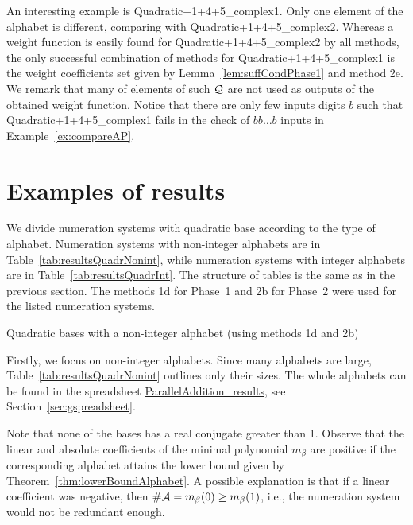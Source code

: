 An interesting example is Quadratic+1+4+5\_complex1. Only one element of the alphabet is different, comparing with Quadratic+1+4+5\_complex2. Whereas a weight function is easily found for Quadratic+1+4+5\_complex2 by all methods, the only successful combination of methods for Quadratic+1+4+5\_complex1 is the weight coefficients set given by Lemma~\ref{lem:suffCondPhase1} and method 2e. We remark that many of elements of such $\mathcal{Q}$ are not used as outputs of the obtained weight function. Notice   that there are only few inputs digits $b$ such that  Quadratic+1+4+5\_complex1 fails in the check of $bb\dots b$ inputs in Example~\ref{ex:compareAP}.





\section{Examples of results}
\label{sec:resultsExamples}
We divide numeration systems with quadratic base according to the type of  alphabet. Numeration systems with non-integer alphabets are in Table~\ref{tab:resultsQuadrNonint}, while numeration systems with integer alphabets are in Table~\ref{tab:resultsQuadrInt}. The structure of tables is the same as in the previous section. The methods 1d for Phase~1 and 2b for Phase~2 were used for the listed numeration systems.

\begin{table}[tpb]
	\begin{center}
	
	\end{center}
\caption{Quadratic bases with a non-integer alphabet (using methods 1d and 2b)}
\label{tab:resultsQuadrNonint}
\end{table}

Firstly, we focus on non-integer alphabets. Since many alphabets are large, Table~\ref{tab:resultsQuadrNonint} outlines only their sizes. The whole alphabets can be found in the spreadsheet \href{https://docs.google.com/spreadsheets/d/1TnhrHdefHfHa0WSeVs4q6XVj3epjPlPlnoekE0E1xeM/edit?usp=sharing}{ParallelAddition\_results}, see Section~\ref{sec:gspreadsheet}.

Note that none of the bases has a real conjugate greater than 1. Observe that the linear and absolute coefficients of the minimal polynomial $m_\beta$ are positive if the corresponding alphabet attains the lower bound given by Theorem~\ref{thm:lowerBoundAlphabet}. A possible explanation is that if a linear coefficient was negative, then $\#\mathcal{A}=m_\beta(0)\geq m_\beta(1)$, i.e., the numeration system would not be redundant  enough.

